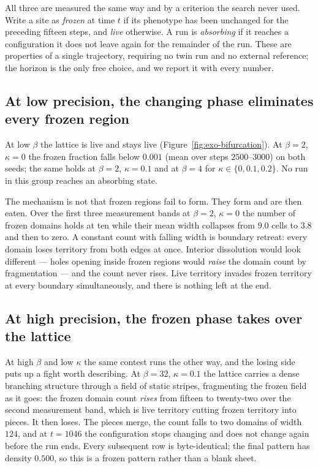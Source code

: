 All three are measured the same way and by a criterion the search never used.
Write a site as \emph{frozen} at time $t$ if its phenotype has been unchanged for
the preceding fifteen steps, and \emph{live} otherwise. A run is \emph{absorbing}
if it reaches a configuration it does not leave again for the remainder of the
run. These are properties of a single
trajectory, requiring no twin run and no external reference; the horizon is the
only free choice, and we report it with every number.

\subsection{At low precision, the changing phase eliminates every frozen region}

At low $\beta$ the lattice is live and stays live (Figure~\ref{fig:exo-bifurcation}). At $\beta = 2$, $\kappa = 0$
the frozen fraction falls below $0.001$ (mean over steps $2500$--$3000$) on
both seeds; the same holds at $\beta = 2$, $\kappa = 0.1$ and at $\beta = 4$ for
$\kappa \in \{0, 0.1, 0.2\}$. No run in this group reaches an absorbing state.

The mechanism is not that frozen regions fail to form. They form and are then
eaten. Over the first three measurement bands at $\beta = 2$, $\kappa = 0$ the
number of frozen domains holds at ten while their mean width collapses from
$9.0$ cells to $3.8$ and then to zero. A constant count with falling width is
boundary retreat: every domain loses territory from both edges at once. Interior
dissolution would look different --- holes opening inside frozen regions would
\emph{raise} the domain count by fragmentation --- and the count never rises.
Live territory invades frozen territory at every boundary simultaneously, and
there is nothing left at the end.

\subsection{At high precision, the frozen phase takes over the lattice}

At high $\beta$ and low $\kappa$ the same contest runs the other way, and the
losing side puts up a fight worth describing. At $\beta = 32$, $\kappa = 0.1$
the lattice carries a dense branching structure through a field of static
stripes, fragmenting the frozen field as it goes: the frozen domain count
\emph{rises} from fifteen to twenty-two over the second measurement band, which
is live territory cutting frozen territory into pieces. It then loses. The
pieces merge, the count falls to two domains of width $124$, and at $t = 1046$
the configuration stops changing and does not change again before the run
ends. Every subsequent row is
byte-identical; the final pattern has density $0.500$, so this is a frozen
pattern rather than a blank sheet.

